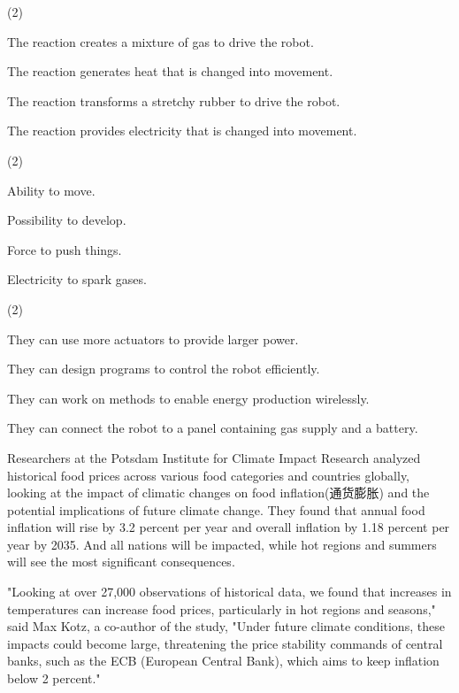 \documentclass{英语试卷}
\begin{document}
\begin{choices}(2)
  \item The reaction creates a mixture of gas to drive the robot.
  \item The reaction generates heat that is changed into movement.
  \item The reaction transforms a stretchy rubber to drive the robot.
  \item The reaction provides electricity that is changed into movement.
\end{choices}
\begin{choices}(2)
  \item Ability to move.
  \item Possibility to develop.
  \item Force to push things.
  \item Electricity to spark gases.
\end{choices}
\begin{choices}(2)
  \item They can use more actuators to provide larger power.
  \item They can design programs to control the robot efficiently.
  \item They can work on methods to enable energy production wirelessly.
  \item They can connect the robot to a panel containing gas supply and a battery.
\end{choices}
\par Researchers at the Potsdam Institute for Climate Impact Research analyzed historical food prices across various food categories and countries globally, looking at the impact of climatic changes on food inflation(通货膨胀) and the potential implications of future climate change. They found that annual food inflation will rise by 3.2 percent per year and overall inflation by 1.18 percent per year by 2035. And all nations will be impacted, while hot regions and summers will see the most significant consequences.\par
\par "Looking at over 27,000 observations of historical data, we found that increases in temperatures can increase food prices, particularly in hot regions and seasons," said Max Kotz, a co-author of the study, "Under future climate conditions, these impacts could become large, threatening the price stability commands of central banks, such as the ECB (European Central Bank), which aims to keep inflation below 2 percent."\par
\end{document}

